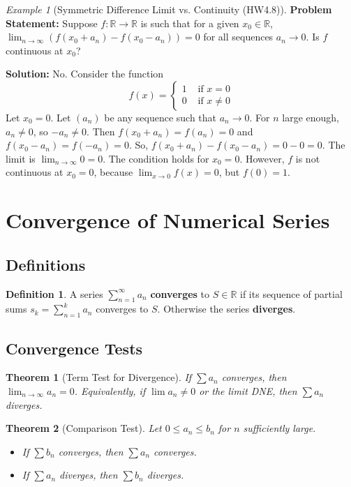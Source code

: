 \documentclass{article}
\theoremstyle{definition}
\newtheorem{definition}{Definition}[section]
\theoremstyle{plain}
\newtheorem{theorem}{Theorem}[section]
\theoremstyle{remark}
\newtheorem{example}{Example}[section]
\newcommand{\R}{\mathbb{R}}
\begin{document}
\begin{example}[Symmetric Difference Limit vs. Continuity (HW4.8)]
\textbf{Problem Statement:} Suppose \(f: \R \to \R\) is such that for a given \(x_0 \in \R\), \(\lim_{n\to\infty} (f(x_0+a_n) - f(x_0-a_n)) = 0\) for all sequences \(a_n \to 0\). Is \(f\) continuous at \(x_0\)?

\textbf{Solution:} No. Consider the function
\[ f(x) = \begin{cases} 1 & \text{ if } x = 0 \\ 0 & \text{ if } x \ne 0 \end{cases} \]
Let \(x_0 = 0\). Let \((a_n)\) be any sequence such that \(a_n \to 0\). For \(n\) large enough, \(a_n \ne 0\), so \(-a_n \ne 0\).
Then \(f(x_0+a_n) = f(a_n) = 0\) and \(f(x_0-a_n) = f(-a_n) = 0\).
So, \(f(x_0+a_n) - f(x_0-a_n) = 0 - 0 = 0\). The limit is \(\lim_{n\to\infty} 0 = 0\).
The condition holds for \(x_0 = 0\).
However, \(f\) is not continuous at \(x_0=0\), because \(\lim_{x\to 0} f(x) = 0\), but \(f(0) = 1\).
\end{example}

\section{Convergence of Numerical Series}

\subsection{Definitions}

\begin{definition}
A series \(\sum_{n=1}^\infty a_n\) \textbf{converges} to \(S \in \R\) if its sequence of partial sums \(s_k = \sum_{n=1}^k a_n\) converges to \(S\). Otherwise the series \textbf{diverges}.
\end{definition}

\subsection{Convergence Tests}

\begin{theorem}[Term Test for Divergence{\cite[Thm 14.5]{Ross}}]
If \(\sum a_n\) converges, then \(\lim_{n\to\infty} a_n = 0\). Equivalently, if \(\lim a_n \ne 0\) or the limit DNE, then \(\sum a_n\) diverges.
\end{theorem}

\begin{theorem}[Comparison Test{\cite[Thm 14.6]{Ross}}]
Let \(0 \le a_n \le b_n\) for \(n\) sufficiently large.
\begin{itemize}
    \item If \(\sum b_n\) converges, then \(\sum a_n\) converges.
    \item If \(\sum a_n\) diverges, then \(\sum b_n\) diverges.
\end{itemize}
\end{theorem}
\end{document}
